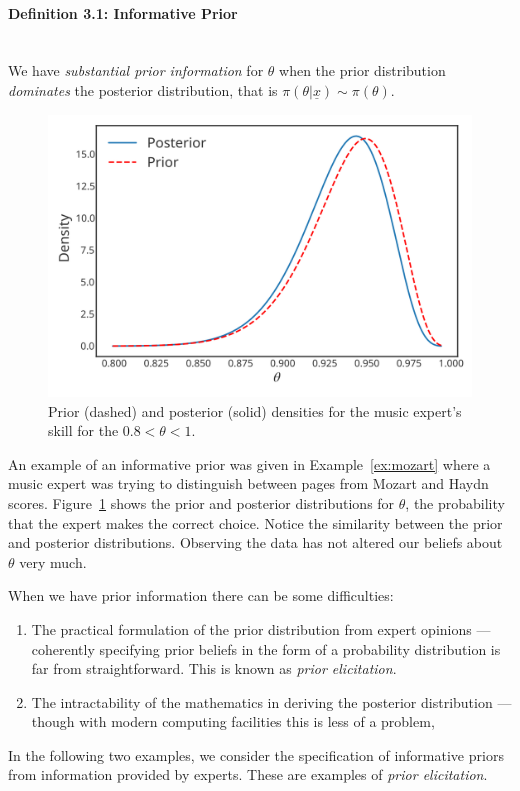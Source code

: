 \paragraph{Definition 3.1: Informative Prior}{~\\
We have \emph{substantial prior information} for $\theta$ when the prior distribution {\it dominates} the posterior distribution, that is
$\pi(\theta|\underline{x})\sim\pi(\theta)$.}
\begin{figure}[h!]

\includegraphics{images/priorposterior1.svg}
\caption{Prior (dashed) and posterior (solid) densities for the music expert's skill for the $0.8 < \theta < 1$.}
\label{fig:substantial}

\end{figure}
An example of  an informative prior was given in Example~\ref{ex:mozart} where a music expert was trying to distinguish between pages from Mozart and Haydn scores. Figure~\ref{fig:substantial} shows the prior and posterior distributions for $\theta$, the probability that the expert makes the correct choice. Notice the similarity between the prior and posterior distributions. Observing the data has not altered our beliefs about $\theta$ very much.

When we have prior information there can be some difficulties:
\begin{enumerate}
\item The practical formulation of the prior distribution from expert opinions ---
coherently specifying prior beliefs in the form of a probability
distribution is far from straightforward. This is known as \emph{prior elicitation}.
\item The intractability of the mathematics in deriving the posterior
distribution --- though with modern computing facilities this is less
of a problem,
\end{enumerate}
In the following two examples, we consider the specification of informative priors from information provided by experts. These are examples of \emph{prior elicitation}.
\clearpage

